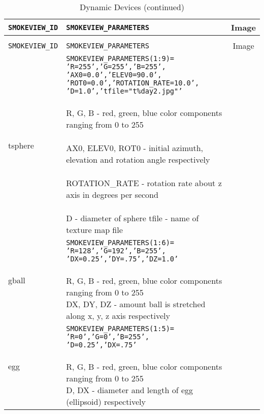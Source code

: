 \begin{longtable}[ht]{|l|l|c|}
\caption{Dynamic Devices}
\label{tab:devices_dynamic}
\\ \hline
{\tt SMOKEVIEW\_ID}  & {\tt SMOKEVIEW\_PARAMETERS} & Image  \\ \hline \hline
\endfirsthead
\caption{Dynamic Devices (continued)}
\\ \hline
{\tt SMOKEVIEW\_ID}  & {\tt SMOKEVIEW\_PARAMETERS} & Image  \\ \hline \hline
\endhead

tsphere&
\parbox[c]{\boxwidth}{
    {\tt SMOKEVIEW\_PARAMETERS(1:9)=}\\
    {\tt 'R=255','G=255','B=255',}\\
    {\tt 'AX0=0.0','ELEV0=90.0',}\\
    {\tt 'ROT0=0.0','ROTATION\_RATE=10.0',}\\
    {\tt 'D=1.0','tfile="t\%day2.jpg"'}\\ \\
R, G, B - red, green, blue color components ranging from 0 to 255\\ \\
AX0, ELEV0, ROT0 - initial azimuth, elevation and rotation angle respectively\\ \\
ROTATION\_RATE - rotation rate about z axis in degrees per second\\ \\
D - diameter of sphere
tfile - name of texture map file

} &
 \\ \hline

gball&
\parbox[c]{\boxwidth}{
{\tt SMOKEVIEW\_PARAMETERS(1:6)=}\\
{\tt 'R=128','G=192','B=255',}\\
{\tt 'DX=0.25','DY=.75','DZ=1.0'}\\  \\
R, G, B - red, green, blue color components ranging from 0 to 255\\
DX, DY, DZ - amount ball is stretched along x, y, z axis respectively
} &
 \\ \hline

egg&
\parbox[c]{\boxwidth}{
{\tt SMOKEVIEW\_PARAMETERS(1:5)=}\\
{\tt 'R=0','G=0','B=255',}\\
{\tt 'D=0.25','DX=.75'}\\ \\
R, G, B - red, green, blue color components ranging from 0 to 255\\
D, DX - diameter and length of egg (ellipsoid) respectively
} &
 \\ \hline


\end{longtable}
